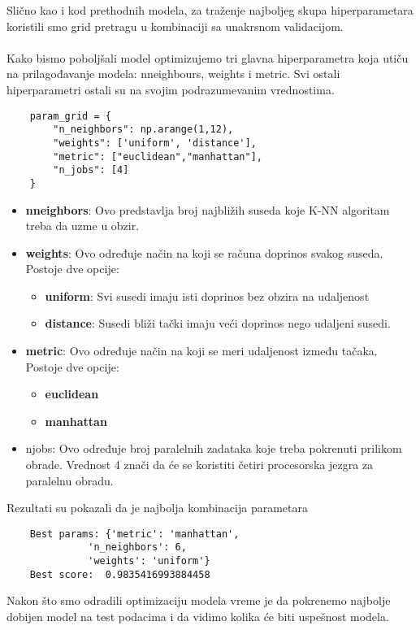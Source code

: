 \documentclass[a4paper,12pt]{article}
\begin{document}
Slično kao i kod prethodnih modela, za traženje najboljeg skupa hiperparametara koristili smo grid pretragu u kombinaciji sa unakrsnom validacijom.
\\\\Kako bismo poboljšali model optimizujemo tri glavna hiperparametra koja utiču na prilagođavanje modela: n\textunderscore neighbours, weights i metric. Svi ostali hiperparametri ostali su na svojim podrazumevanim vrednostima.
\begin{verbatim}
    param_grid = {
        "n_neighbors": np.arange(1,12),
        "weights": ['uniform', 'distance'],
        "metric": ["euclidean","manhattan"],
        "n_jobs": [4]
    }
\end{verbatim}
\begin{itemize}
    \item \textbf{n\textunderscore neighbors}: Ovo predstavlja broj najbližih suseda koje K-NN algoritam treba da uzme u obzir.
    \item \textbf{weights}: Ovo određuje način na koji se računa doprinos svakog suseda. Postoje dve opcije:
    \begin{itemize}
        \item \textbf{uniform}: Svi susedi imaju isti doprinos bez obzira na udaljenost
        \item \textbf{distance}: Susedi bliži tački imaju veći doprinos nego udaljeni susedi.
    \end{itemize}
    \item \textbf{metric}: Ovo određuje način na koji se meri udaljenost između tačaka. Postoje dve opcije:
    \begin{itemize}
        \item \textbf{euclidean}
        \item \textbf{manhattan}
    \end{itemize}
    \item n\textunderscore jobs: Ovo određuje broj paralelnih zadataka koje treba pokrenuti prilikom obrade. Vrednost 4 znači da će se koristiti četiri procesorska jezgra za paralelnu obradu.
\end{itemize}
Rezultati su pokazali da je najbolja kombinacija parametara
\begin{verbatim}
    Best params: {'metric': 'manhattan',
              'n_neighbors': 6,
              'weights': 'uniform'}
    Best score:  0.9835416993884458
\end{verbatim}

Nakon što smo odradili optimizaciju modela vreme je da pokrenemo najbolje dobijen model na test podacima i da vidimo kolika će biti uspešnost modela.
\end{document}
